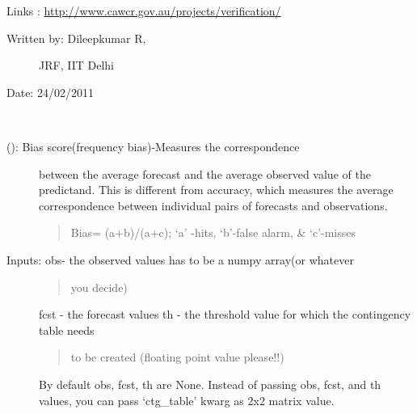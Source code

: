 \documentclass[letterpaper,10pt,english]{sphinxmanual}
\begin{document}
\begin{fulllineitems}
\begin{description}
\begin{description}
\end{description}

Links : \href{http://www.cawcr.gov.au/projects/verification/}{http://www.cawcr.gov.au/projects/verification/}
\begin{description}
\item[{Written by: Dileepkumar R,}] \leavevmode
JRF, IIT Delhi

\end{description}

Date: 24/02/2011

\end{description}

\end{fulllineitems}


\begin{fulllineitems}
\label{diagnosis:ctgfunction.bias_score}~\begin{description}
\item[{{\hyperref[diagnosis:ctgfunction.bias_score]{}} (): Bias score(frequency bias)-Measures the correspondence}] \leavevmode
between the average forecast and the average observed value of the
predictand. This is different from accuracy, which measures the
average correspondence between individual pairs of forecasts and
observations.
\begin{quote}

Bias= (a+b)/(a+c); `a' -hits, `b'-false alarm, \& `c'-misses
\end{quote}

\item[{Inputs: obs- the observed values has to be a numpy array(or whatever}] \leavevmode\begin{quote}

you decide)
\end{quote}

fcst - the forecast values
th  - the threshold value for which the contingency table needs
\begin{quote}

to be created (floating point value please!!)
\end{quote}

By default obs, fcst, th are None. Instead of passing obs, fcst,
and th values, you can pass `ctg\_table' kwarg as 2x2 matrix value.


\end{description}
\end{fulllineitems}
\end{document}
